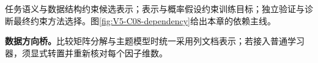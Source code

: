 \documentclass[UTF8,a4paper,11pt,openany]{ctexbook}
\begin{document}
\setcounter{page}{924}
\setcounter{chapter}{37}
\setcounter{section}{0}
\setcounter{figure}{0}
\pagestyle{headings}
任务语义与数据结构约束候选表示；表示与概率假设约束训练目标；独立验证与诊断最终约束方法选择。图\ref{fig:V5-C08-dependency}给出本章的依赖主线。

\FloatBarrier
\textbf{数据方向桥。}比较矩阵分解与主题模型时统一采用列文档表示；若接入普通学习器，须显式转置并重新核对每个因子维数。
\end{document}
